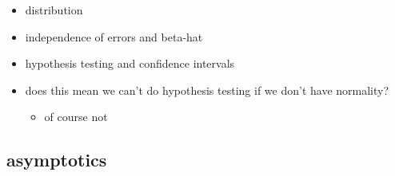 \documentclass[11pt]{article}
\begin{document}
\begin{itemize}
\item distribution
\item independence of errors and beta-hat
\item hypothesis testing and confidence intervals
\item does this mean we can't do hypothesis testing if we don't have
       normality?
\begin{itemize}
\item of course not
\end{itemize}
\end{itemize}
\subsection{asymptotics}
\label{sec-1-3}
\end{document}

